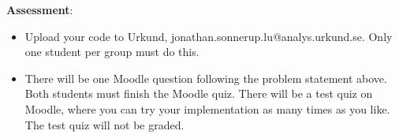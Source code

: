 \documentclass{article}
\begin{document}
\begin{description}
{				\textbf{Assessment}:
				\begin{itemize}
					\item Upload your code to Urkund, jonathan.sonnerup.lu@analys.urkund.se.
					Only one student per group must do this.
					
					\item There will be one Moodle question following the problem statement above. 
					Both students must finish the Moodle quiz.
					There will be a test quiz on Moodle, where you can try your implementation as many times as you like. The test quiz will not be graded.
				\end{itemize}
			}
			
		\end{description}
		
	
\end{document}
